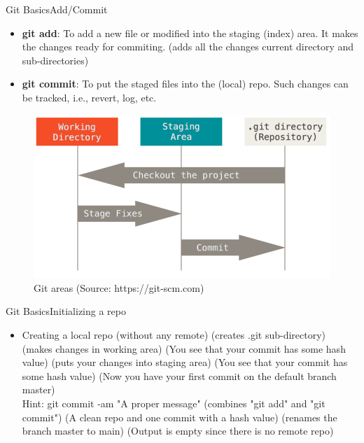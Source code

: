 \begin{frame}{Git Basics}{Add/Commit}
  \begin{itemize}
    \item \textbf{git add}: To add a new file or modified into the staging (index) area. It makes 
      the changes ready for commiting.
       (adds all the changes current directory and sub-directories)
    \item \textbf{git commit}: To put the staged files into the (local) repo. Such changes can be tracked, i.e.,
      revert, log, etc.
  \end{itemize}
  \begin{figure}
    \begin{center}
    \includegraphics[width=0.55\linewidth]{pics/areas.png}
    \vspace{-0.3cm}
    \caption{\footnotesize Git areas (Source: https://git-scm.com)}
  \end{center}
\end{figure}
\end{frame}

\begin{frame}{Git Basics}{Initializing a repo}
  \begin{itemize}
    \item Creating a local repo (without any remote)
     (creates .git sub-directory)
     (makes changes in  working area)
     (You see that your commit has some hash value)
     (puts your changes into staging area)
     (You see that your commit has some hash value)
     (Now you have your first commit on the default branch master)
   \\ Hint:
      {\tiny {\color{blue}git commit -am "A proper message"} (combines "git add" and "git commit")}
     (A clean repo and one commit with a hash value)
     (renames the branch master to main)
     (Output is empty since there is no remote repo)
  \end{itemize}
\end{frame}


